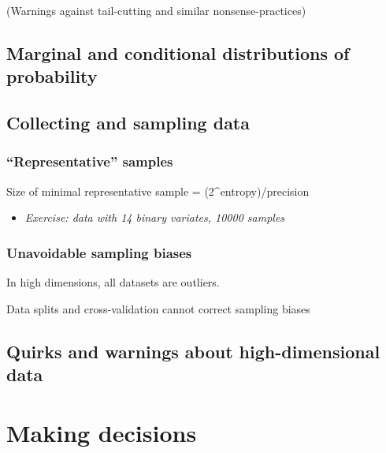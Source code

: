 \documentclass[
  a4paper,
  DIV=11,
  numbers=noendperiod,
  oneside]{scrreprt}
\providecommand{\tightlist}{%
  \setlength{\itemsep}{0pt}\setlength{\parskip}{0pt}}\usepackage{longtable,booktabs,array}
\begin{document}
(Warnings against tail-cutting and similar nonsense-practices)

\hypertarget{marginal-and-conditional-distributions-of-probability}{%
\section{Marginal and conditional distributions of
probability}\label{marginal-and-conditional-distributions-of-probability}}

\hypertarget{collecting-and-sampling-data}{%
\section{Collecting and sampling
data}\label{collecting-and-sampling-data}}

\hypertarget{representative-samples}{%
\subsection{``Representative'' samples}\label{representative-samples}}

Size of minimal representative sample = (2\^{}entropy)/precision

\begin{itemize}
\tightlist
\item
  \emph{Exercise: data with 14 binary variates, 10000 samples}
\end{itemize}

\hypertarget{unavoidable-sampling-biases}{%
\subsection{Unavoidable sampling
biases}\label{unavoidable-sampling-biases}}

In high dimensions, all datasets are outliers.

Data splits and cross-validation cannot correct sampling biases

\hypertarget{quirks-and-warnings-about-high-dimensional-data}{%
\section{Quirks and warnings about high-dimensional
data}\label{quirks-and-warnings-about-high-dimensional-data}}


\hypertarget{making-decisions}{%
\chapter{Making decisions}\label{making-decisions}}
\end{document}
